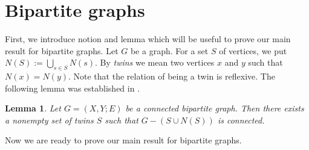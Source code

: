 \documentclass[12pt]{article}
\newtheorem{lem}[tw]{Lemma}
\begin{document}
\section{Bipartite graphs}
First, we introduce notion and lemma which will be useful to prove our main result for bipartite graphs. Let $G$ be a graph. For a set $S$ of vertices, we put $N(S):= \bigcup\limits_{s\in S}N(s)$. By \textit{twins} we mean two vertices $x$ and $y$ such that $N(x) = N(y)$. Note that the relation of being a twin is reflexive. The following lemma was established in \cite{Havet Paramaguru Sampathkumar}. 

\begin{lem}
\label{twins}
Let $G=(X, Y; E)$ be a connected bipartite graph. Then there exists a nonempty set of twins $S$ such that $G-(S \cup N(S))$ is connected.
\end{lem}

Now we are ready to prove our main result for bipartite graphs.
\end{document}
